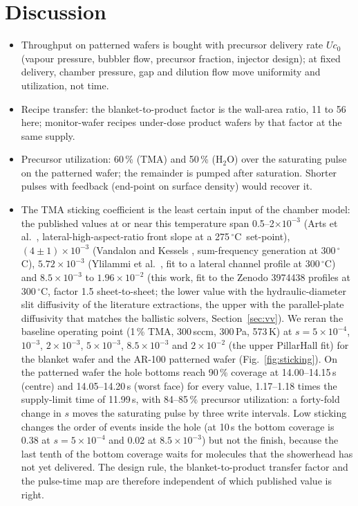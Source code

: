 \documentclass[11pt,letterpaper]{article}
\newcommand{\degC}{$^{\circ}$C}
\begin{document}
\section{Discussion}
\label{sec:discussion}
\begin{itemize}
\item Throughput on patterned wafers is bought with precursor delivery rate $U c_0$ (vapour pressure, bubbler flow, precursor fraction, injector design); at fixed delivery, chamber pressure, gap and dilution flow move uniformity and utilization, not time.
\item Recipe transfer: the blanket-to-product factor is the wall-area ratio, 11 to 56 here; monitor-wafer recipes under-dose product wafers by that factor at the same supply.
\item Precursor utilization: 60\,\% (TMA) and 50\,\% (H$_2$O) over the saturating pulse on the patterned wafer; the remainder is pumped after saturation. Shorter pulses with feedback (end-point on surface density) would recover it.
\item The TMA sticking coefficient is the least certain input of the chamber model: the published values at or near this temperature span 0.5--2$\times10^{-3}$ (Arts et al.\ \cite{arts2019jvsta}, lateral-high-aspect-ratio front slope at a 275\,\degC\ set-point), $(4 \pm 1)\times10^{-3}$ (Vandalon and Kessels \cite{vandalon2016}, sum-frequency generation at 300\,\degC), $5.72\times10^{-3}$ (Ylilammi et al.\ \cite{ylilammi2018}, fit to a lateral channel profile at 300\,\degC) and $8.5\times10^{-3}$ to $1.96\times10^{-2}$ (this work, fit to the Zenodo 3974438 profiles \cite{zenodo3974438} at 300\,\degC, factor 1.5 sheet-to-sheet; the lower value with the hydraulic-diameter slit diffusivity of the literature extractions, the upper with the parallel-plate diffusivity that matches the ballistic solvers, Section~\ref{sec:vv}). We reran the baseline operating point (1\,\% TMA, 300\,sccm, 300\,Pa, 573\,K) at $s = 5\times10^{-4}$, $10^{-3}$, $2\times10^{-3}$, $5\times10^{-3}$, $8.5\times10^{-3}$ and $2\times10^{-2}$ (the upper PillarHall fit) for the blanket wafer and the AR-100 patterned wafer (Fig.~\ref{fig:sticking}). On the patterned wafer the hole bottoms reach 90\,\% coverage at 14.00--14.15\,s (centre) and 14.05--14.20\,s (worst face) for every value, 1.17--1.18 times the supply-limit time of 11.99\,s, with 84--85\,\% precursor utilization: a forty-fold change in $s$ moves the saturating pulse by three write intervals. Low sticking changes the order of events inside the hole (at 10\,s the bottom coverage is 0.38 at $s = 5\times10^{-4}$ and 0.02 at $8.5\times10^{-3}$) but not the finish, because the last tenth of the bottom coverage waits for molecules that the showerhead has not yet delivered. The design rule, the blanket-to-product transfer factor and the pulse-time map are therefore independent of which published value is right.

\end{itemize}
\end{document}
